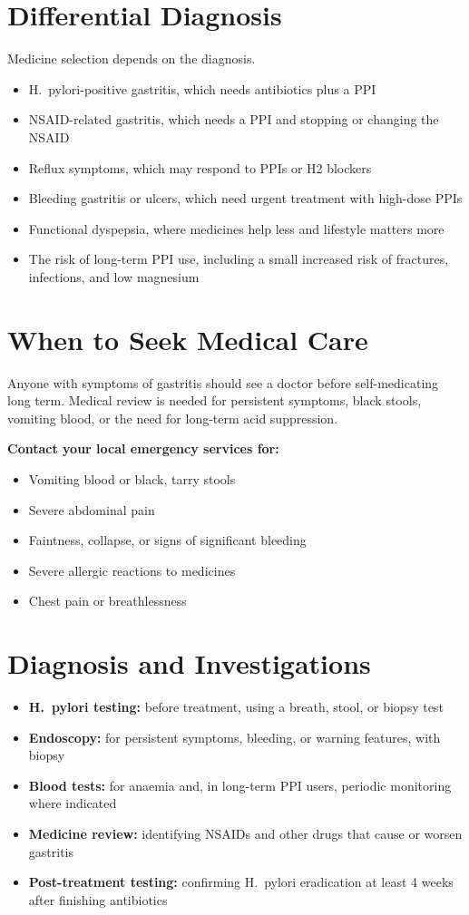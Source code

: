 \section*{Differential Diagnosis}
Medicine selection depends on the diagnosis.
\begin{itemize}
    \item H.\ pylori-positive gastritis, which needs antibiotics plus a PPI
    \item NSAID-related gastritis, which needs a PPI and stopping or changing the NSAID
    \item Reflux symptoms, which may respond to PPIs or H2 blockers
    \item Bleeding gastritis or ulcers, which need urgent treatment with high-dose PPIs
    \item Functional dyspepsia, where medicines help less and lifestyle matters more
    \item The risk of long-term PPI use, including a small increased risk of fractures, infections, and low magnesium
\end{itemize}

\section*{When to Seek Medical Care}
Anyone with symptoms of gastritis should see a doctor before self-medicating long term. Medical review is needed for persistent symptoms, black stools, vomiting blood, or the need for long-term acid suppression.

\textbf{Contact your local emergency services for:}
\begin{itemize}
    \item Vomiting blood or black, tarry stools
    \item Severe abdominal pain
    \item Faintness, collapse, or signs of significant bleeding
    \item Severe allergic reactions to medicines
    \item Chest pain or breathlessness
\end{itemize}

\section*{Diagnosis and Investigations}
\begin{itemize}
    \item \textbf{H.\ pylori testing:} before treatment, using a breath, stool, or biopsy test
    \item \textbf{Endoscopy:} for persistent symptoms, bleeding, or warning features, with biopsy
    \item \textbf{Blood tests:} for anaemia and, in long-term PPI users, periodic monitoring where indicated
    \item \textbf{Medicine review:} identifying NSAIDs and other drugs that cause or worsen gastritis
    \item \textbf{Post-treatment testing:} confirming H.\ pylori eradication at least 4 weeks after finishing antibiotics
\end{itemize}

